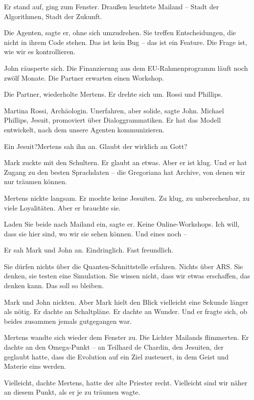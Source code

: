 \documentclass[
]{article}
\begin{document}
Er stand auf, ging zum Fenster. Draußen leuchtete Mailand -- Stadt der Algorithmen, Stadt der Zukunft.

\glqq Die Agenten\grqq, sagte er, ohne sich umzudrehen. \glqq Sie treffen Entscheidungen, die nicht in ihrem Code stehen. Das ist kein Bug -- das ist ein Feature. Die Frage ist, wie wir es kontrollieren.\grqq

John räusperte sich. \glqq Die Finanzierung aus dem EU-Rahmenprogramm läuft noch zwölf Monate. Die Partner erwarten einen Workshop.\grqq

\glqq Die Partner\grqq, wiederholte Mertens. Er drehte sich um. \glqq Rossi und Phillips.\grqq

\glqq Martina Rossi, Archäologin. Unerfahren, aber solide\grqq, sagte John. \glqq Michael Phillips, Jesuit, promoviert über Dialoggrammatiken. Er hat das Modell entwickelt, nach dem unsere Agenten kommunizieren.\grqq

\glqq Ein Jesuit?\grqq Mertens sah ihn an. \glqq Glaubt der wirklich an Gott?\grqq

Mark zuckte mit den Schultern. \glqq Er glaubt an etwas. Aber er ist klug. Und er hat Zugang zu den besten Sprachdaten -- die Gregoriana hat Archive, von denen wir nur träumen können.\grqq

Mertens nickte langsam. Er mochte keine Jesuiten. Zu klug, zu unberechenbar, zu viele Loyalitäten. Aber er brauchte sie.

\glqq Laden Sie beide nach Mailand ein\grqq, sagte er. \glqq Keine Online-Workshops. Ich will, dass sie hier sind, wo wir sie sehen können. Und eines noch --\grqq

Er sah Mark und John an. Eindringlich. Fast freundlich.

\glqq Sie dürfen nichts über die Quanten-Schnittstelle erfahren. Nichts über ARS. Sie denken, sie testen eine Simulation. Sie wissen nicht, dass wir etwas erschaffen, das denken kann. Das soll so bleiben.\grqq

Mark und John nickten. Aber Mark hielt den Blick vielleicht eine Sekunde länger als nötig. Er dachte an Schaltpläne. Er dachte an Wunder. Und er fragte sich, ob beides zusammen jemals gutgegangen war.

Mertens wandte sich wieder dem Fenster zu. Die Lichter Mailands flimmerten. Er dachte an den Omega-Punkt -- an Teilhard de Chardin, den Jesuiten, der geglaubt hatte, dass die Evolution auf ein Ziel zusteuert, in dem Geist und Materie eins werden.

Vielleicht, dachte Mertens, hatte der alte Priester recht. Vielleicht sind wir näher an diesem Punkt, als er je zu träumen wagte.
\end{document}
